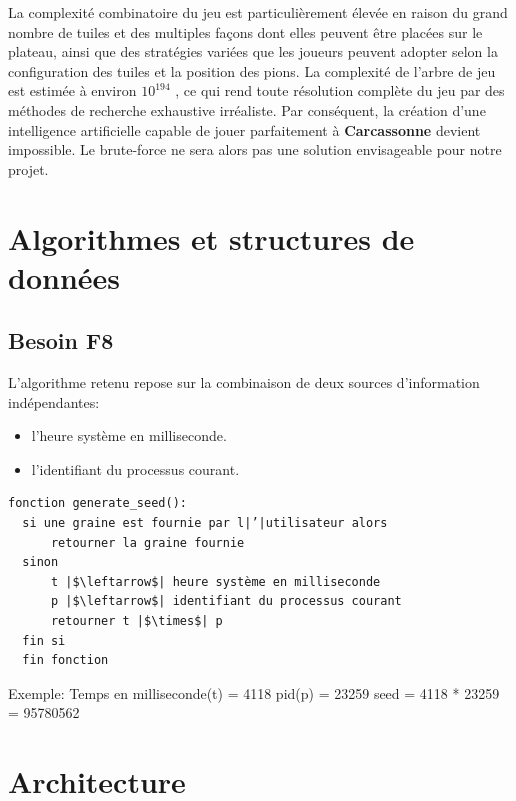 \documentclass[a4paper]{article}
\begin{document}
La complexité combinatoire du jeu est particulièrement élevée en raison du grand nombre de tuiles et des multiples façons dont elles peuvent être placées sur le plateau, ainsi que des stratégies variées que les joueurs peuvent adopter selon la configuration des tuiles et la position des pions. 
La complexité de l’arbre de jeu est estimée à environ $10^{194}$ \cite{heydencarcassonne}, ce qui rend toute résolution complète du jeu par des méthodes de recherche exhaustive irréaliste. 
Par conséquent, la création d’une intelligence artificielle capable de jouer parfaitement à \textbf{Carcassonne} devient impossible. Le brute-force ne sera alors pas une solution envisageable pour notre projet.







\section{Algorithmes et structures de données}

\subsection{Besoin F8}
L’algorithme retenu repose sur la combinaison de deux sources d’information indépendantes:
\begin{itemize}
  \item[-] l’heure système en milliseconde.
  \item[-] l’identifiant du processus courant.
\end{itemize}

{\normalsize
  \begin{verbatim}
fonction generate_seed():
  si une graine est fournie par l|’|utilisateur alors
      retourner la graine fournie
  sinon
      t |$\leftarrow$| heure système en milliseconde
      p |$\leftarrow$| identifiant du processus courant
      retourner t |$\times$| p
  fin si
  fin fonction
  \end{verbatim}
}




  

Exemple:
Temps en milliseconde(t) = 4118
pid(p) = 23259
seed = 4118 * 23259 = 95780562









\section{Architecture}
\end{document}
